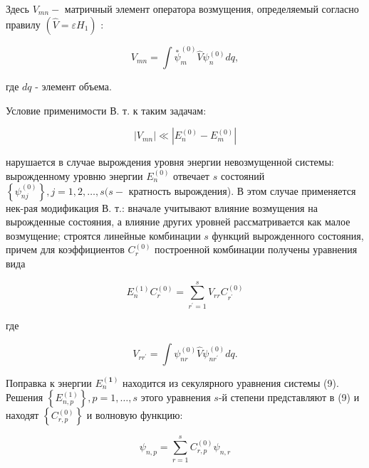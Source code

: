 \documentclass[10pt]{article}
\begin{document}
Здесь $V_{m n}-$ матричный элемент оператора возмущения, определяемый согласно правилу $\left(\hat{V}=\varepsilon H_{1}\right)$ :



\[

V_{m n}=\int \stackrel{*}{\psi}_{m}^{(0)} \hat{V} \psi_{n}^{(0)} d q,

\]



где $d q$ - элемент объема.



Условие применимости В. т. к таким задачам:



\[

\left|V_{m n}\right| \ll\left|E_{n}^{(0)}-E_{m}^{(0)}\right|

\]



нарушается в случае вырождения уровня энергии невозмущенной системы: вырожденному уровню энергии $E_{n}^{(0)}$ отвечает $s$ состояний $\left\{\psi_{n j}^{(0)}\right\}, j=1,2, \ldots, s(s-$ кратность вырождения). В этом случае применяется нек-рая модификация В. т.: вначале учитывают влияние возмущения на вырожденные состояния, а влияние других уровней рассматривается как малое возмущение; строятся линейные комбинации $s$ функций вырожденного состояния, причем для коэффициентов $C_{r}^{(0)}$ построенной комбинации получены уравнения вида



\[

E_{n}^{(1)} C_{r}^{(0)}=\sum_{r^{\prime}=1}^{s} V_{r r} C_{r^{\prime}}^{(0)}

\]



где



\[

V_{r r^{\prime}}=\int \psi_{n r}^{(0)} \hat{V} \psi_{n r^{\prime}}^{(0)} d q .

\]



Поправка к энергии $E_{n}^{(\mathbf{1})}$ находится из секулярного уравнения системы (9). Решения $\left\{E_{n, p}^{(1)}\right\}, p=1, \ldots, s$ этого уравнения $s$-й степени представляют в (9) и находят $\left\{C_{r, p}^{(0)}\right\}$ и волновую функцию:



\[

\psi_{n, p}=\sum_{r=1}^{s} C_{r, p}^{(0)} \psi_{n, r}

\]
\end{document}
